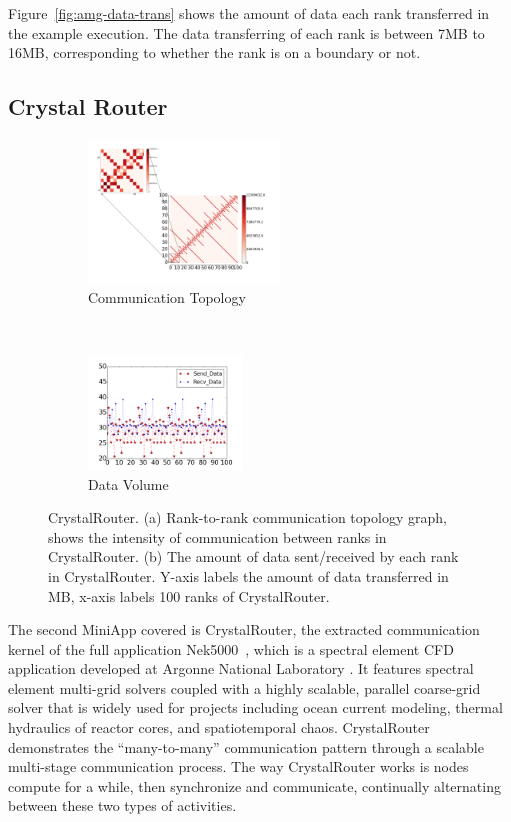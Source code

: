 \documentclass[conference]{IEEEtran}
\begin{document}
Figure~\ref{fig:amg-data-trans} shows the amount of data each rank transferred in the example execution. The data transferring of each rank is between 7MB to 16MB, corresponding to whether the rank is on a boundary or not.

\subsection{Crystal Router}
\label{sec:crystalrouter}

\begin{figure}[t!]
    \centering
    \begin{subfigure}[t]{0.25\textwidth}
        \centering
        \includegraphics[height=1.5in]{figs/appstudy/cr/cr_pip}
        \caption{Communication Topology}
        \label{fig:cr-communication-topology}
    \end{subfigure}
    ~
    \begin{subfigure}[t]{0.22\textwidth}
        \centering
        \includegraphics[height=1.2in]{figs/appstudy/cr/cr_data_transfer}
        \caption{Data Volume}
        \label{fig:cr-data-trans}
    \end{subfigure}
    \caption{CrystalRouter. (a) Rank-to-rank communication topology graph, shows the intensity of communication between ranks in CrystalRouter. (b) The amount of data sent/received by each rank in CrystalRouter. Y-axis labels the amount of data transferred in MB, x-axis labels 100 ranks of CrystalRouter. }
\end{figure}

The second MiniApp covered is CrystalRouter, the extracted communication kernel of the full application Nek5000~\cite{crystalrouter}, which is a spectral element CFD application developed at Argonne National Laboratory \cite{nek5000}. It features spectral element multi-grid solvers coupled with a highly scalable, parallel coarse-grid solver that is widely used for projects including ocean current modeling, thermal hydraulics of reactor cores, and spatiotemporal chaos. CrystalRouter demonstrates the ``many-to-many'' communication pattern through a scalable multi-stage communication process. The way CrystalRouter works is nodes compute for a while, then synchronize and communicate, continually alternating between these two types of activities.
\end{document}
